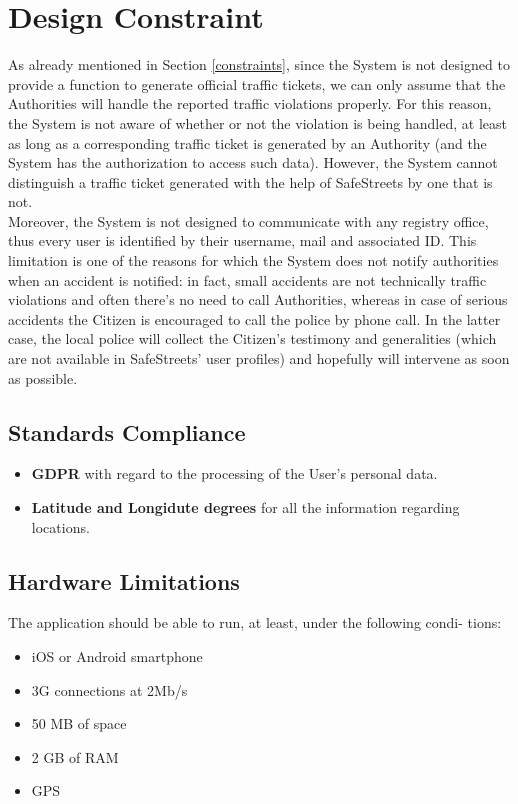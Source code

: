 \documentclass{report}
\begin{document}
\section{Design Constraint}
As already mentioned in Section \ref{constraints}, since the System is not designed to provide a function to generate official traffic tickets, we can only assume that the Authorities will handle the reported traffic violations properly. For this reason, the System is not aware of whether or not the violation is being handled, at least as long as a corresponding traffic ticket is generated by an Authority (and the System has the authorization to access such data). However, the System cannot distinguish a traffic ticket generated with the help of SafeStreets by one that is not.
\\
Moreover, the System is not designed to communicate with any registry office, thus every user is identified by their username, mail and associated ID. This limitation is one of the reasons for which the System does not notify authorities when an accident is notified: in fact, small accidents are not technically traffic violations and often there's no need to call Authorities, whereas in case of serious accidents the Citizen is encouraged to call the police by phone call. In the latter case, the local police will collect the Citizen's testimony and generalities (which are not available in SafeStreets' user profiles) and hopefully will intervene as soon as possible. 
\subsection{Standards Compliance}
\begin{itemize}
	\item \textbf{GDPR} with regard to the processing of the User's personal data.
	\item \textbf{Latitude and Longidute degrees} for all the information regarding locations.
\end{itemize}
\subsection{Hardware Limitations}
The application should be able to run, at least, under the following condi-
tions:
\begin{itemize}
	\item iOS or Android smartphone
	\item 3G connections at 2Mb/s
	\item 50 MB of space
	\item 2 GB of RAM
	\item GPS
\end{itemize}
\newpage
\end{document}
